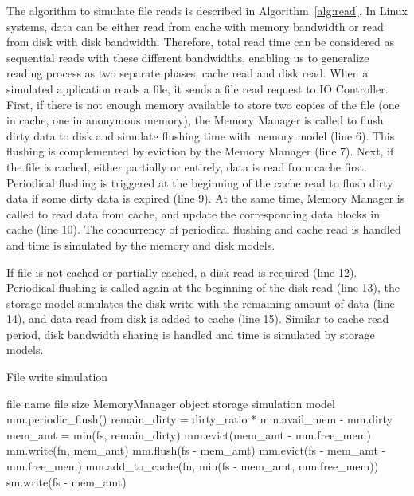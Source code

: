 \documentclass[conference]{IEEEtran}
\newcommand{\Desc}[2]{\State \makebox[2em][l]{#1}#2}
\begin{document}
			The algorithm to simulate file reads is described in 
			Algorithm~\ref{alg:read}.   
			In Linux systems, data can be either read from cache with memory bandwidth 
			or read from disk with disk bandwidth. 
			Therefore, total read time can be considered as sequential reads with 
			these different bandwidths, enabling us to generalize reading process as 
			two separate phases, cache read and disk read. 
			When a simulated application reads a file, it sends a file read request 
			to IO Controller. 
			First, if there is not enough memory available to store two
			copies of the file (one in cache, one in anonymous memory), the
			Memory Manager is called to flush dirty data to disk and simulate 
			flushing time with memory model (line 6).
			This flushing is complemented by eviction by the Memory Manager (line 7). 
			Next, if the file is cached, either partially or entirely, data is read from 
			cache first. Periodical flushing is triggered at the beginning of the 
			cache read to flush dirty data if some dirty data is expired (line 9).
			At the same time, Memory Manager is called to read data from cache, 
			and update the corresponding data blocks in cache (line 10). 
			The concurrency of periodical flushing and cache read is handled and 
			time is simulated by the memory and disk models.
			
			If file is not cached or partially cached, a disk read is required (line 12). 
			Periodical flushing is called again at the beginning of the disk read 
			(line 13), the storage model simulates the disk write with the remaining 
			amount of data (line 14), and data read from disk is added to cache 
			(line 15). Similar to cache read period, disk bandwidth sharing is handled 
			and time is simulated by storage models.

			\begin{algorithm}\caption{File write simulation}\label{alg:write}
				\small
				\begin{algorithmic}[1]
					\Input
        				\Desc{fn}{file name}
        				\Desc{fs}{file size}
						\Desc{mm}{MemoryManager object}
						\Desc{sm}{storage simulation model}
   					\EndInput
   					\State mm.periodic\_flush()
					\State remain\_dirty = dirty\_ratio * mm.avail\_mem - mm.dirty
					\State mem\_amt = min(fs, remain\_dirty)
					 
    					\State mm.evict(mem\_amt - mm.free\_mem)
    					\State mm.write(fn, mem\_amt) 
    				\EndIf
					  
						\State mm.flush(fs - mem\_amt)  
						\State mm.evict(fs - mem\_amt  - mm.free\_mem) 
						\State mm.add\_to\_cache(fn, min(fs - mem\_amt, mm.free\_mem))
						\State sm.write(fs - mem\_amt)
					\EndIf
					
				\end{algorithmic}
			\end{algorithm}
\end{document}
